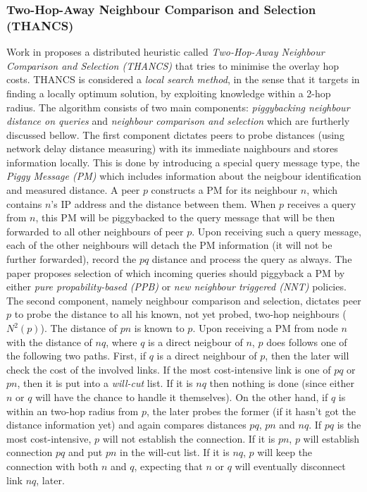 \subsubsection{Two-Hop-Away Neighbour Comparison and Selection (THANCS)}
Work in \cite{liu_thancs_2005,liu_thancs_2008} proposes a distributed heuristic
called \emph{Two-Hop-Away Neighbour Comparison and Selection (THANCS)} that
tries to minimise the overlay hop costs. THANCS is considered a \emph{local
search method}, in the sense that it targets in finding a locally optimum
solution, by exploiting knowledge within a 2-hop radius. The algorithm consists
of two main components: \emph{piggybacking neighbour distance on queries} and
\emph{neighbour comparison and selection} which are furtherly discussed bellow.
The first component dictates peers to probe distances (using network delay
distance measuring) with its immediate naighbours and stores information
locally. This is done by introducing a special query message type, the
\emph{Piggy Message (PM)} which includes information about the neigbour
identification and measured distance. A peer $p$ constructs a PM for its
neighbour $n$, which contains $n$'s IP address and the distance between them.
When $p$ receives a query from $n$, this PM will be piggybacked to the query
message that will be then forwarded to all other neighbours of peer $p$. Upon
receiving such a query message, each of the other neighbours will detach the PM
information (it will not be further forwarded), record the $pq$ distance and
process the query as always. The paper proposes selection of which incoming
queries should piggyback a PM by either \emph{pure propability-based (PPB)} or
\emph{new neighbour triggered (NNT)} policies. The second component, namely
neighbour comparison and selection, dictates peer $p$ to probe the distance to
all his known, not yet probed, two-hop neighbours ($ N^2(p)$). The distance of
$pn$ is known to $p$. Upon receiving a PM from node $n$ with the distance of
$nq$, where $q$ is a direct neigbour of $n$, $p$ does follows one of the
following two paths. First, if $q$ is a direct neighbour of $p$, then the later
will check the cost of the involved links. If the most cost-intensive link is
one of $pq$ or $pn$, then it is put into a \emph{will-cut} list. If it is $nq$
then nothing is done (since either $n$ or $q$ will have the chance to handle it
themselves). On the other hand, if $q$ is within an two-hop radius from $p$,
the later probes the former (if it hasn't got the distance information yet) and
again compares distances $pq$, $pn$ and $nq$. If $pq$ is the most
cost-intensive, $p$ will not establish the connection. If it is $pn$, $p$ will
establish connection $pq$ and put $pn$ in the will-cut list. If it is $nq$, $p$
will keep the connection with both $n$ and $q$, expecting that $n$ or $q$ will
eventually disconnect link $nq$, later.

